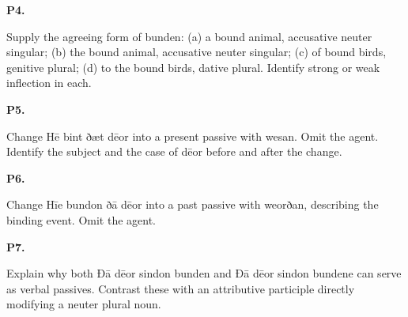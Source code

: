 \par\begin{minipage}{\linewidth}\raggedright
\textbf{P4.}

Supply the agreeing form of bunden: (a) a bound animal, accusative neuter singular; (b) the bound animal, accusative neuter singular; (c) of bound birds, genitive plural; (d) to the bound birds, dative plural. Identify strong or weak inflection in each.

\end{minipage}\par\addvspace{4pt}

\par\begin{minipage}{\linewidth}\raggedright
\textbf{P5.}

Change Hē bint ðæt dēor into a present passive with wesan. Omit the agent. Identify the subject and the case of dēor before and after the change.

\end{minipage}\par\addvspace{4pt}

\par\begin{minipage}{\linewidth}\raggedright
\textbf{P6.}

Change Hīe bundon ðā dēor into a past passive with weorðan, describing the binding event. Omit the agent.

\end{minipage}\par\addvspace{4pt}

\par\begin{minipage}{\linewidth}\raggedright
\textbf{P7.}

Explain why both Ðā dēor sindon bunden and Ðā dēor sindon bundene can serve as verbal passives. Contrast these with an attributive participle directly modifying a neuter plural noun.

\end{minipage}\par\addvspace{4pt}

